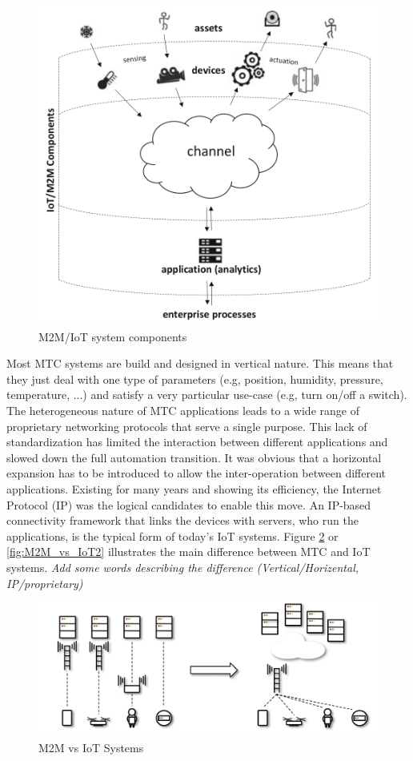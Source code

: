 \documentclass[conference]{IEEEtran}
\begin{document}
\begin{figure}
\centerline{\includegraphics[width=\linewidth]{Pictures/IoT Components.png}}
\caption{M2M/IoT system components}
\label{fig:IoT_components}
\end{figure}


Most MTC systems are build and designed in vertical nature. This means that they just deal with one type of parameters (e.g, position, humidity, pressure, temperature, ...) and satisfy a very particular use-case (e.g, turn on/off a switch). The heterogeneous nature of MTC applications leads to a wide range of proprietary networking protocols that serve a single purpose. This lack of standardization has limited the interaction between different applications and slowed down the full automation transition. It was obvious that a horizontal expansion has to be introduced to allow the inter-operation between different applications. Existing for many years and showing its efficiency, the Internet Protocol (IP) was the logical candidates to enable this move. An IP-based connectivity framework that links the devices with servers, who run the applications, is the typical form of today's IoT systems. Figure \ref{fig:M2M_vs_IoT} or \ref{fig:M2M_vs_IoT2} illustrates the main difference between MTC and IoT systems. \emph{Add some words describing the difference (Vertical/Horizental, IP/proprietary)}
\begin{figure}
\centerline{\includegraphics[width=\linewidth]{Pictures/M2M to IoT.png}}
\caption{M2M vs IoT Systems}
\label{fig:M2M_vs_IoT}
\end{figure}
\end{document}
